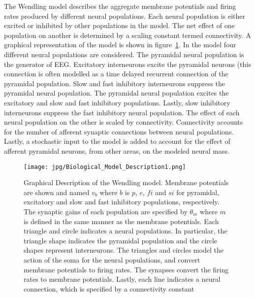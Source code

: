 The Wendling model describes the aggregate membrane potentials and firing rates produced by different neural populations. Each neural population is either excited or inhibited by other populations in the model. The net effect of one population on another is determined by a scaling constant termed connectivity. A graphical representation of the model is shown in figure~\ref{fig: Biological}. In the model four different neural populations are considered. The pyramidal neural population is the generator of EEG. Excitatory interneurons excite the pyramidal neurons (this connection is often modelled as a time delayed recurrent connection of the pyramidal population. Slow and fast inhibitory interneurons suppress the pyramidal neural population. The pyramidal neural population excites the excitatory and slow and fast inhibitory populations. Lastly, slow inhibitory interneurons suppress the fast inhibitory neural population. The effect of each neural population on the other is scaled by connectivity. Connectivity accounts for the number of afferent synaptic connections between neural populations.  Lastly, a stochastic input to the model is added to account for the effect of afferent pyramidal neurons, from other areas, on the modeled neural mass.%
\begin{figure}  %
	\centering
		\texttt{[image: jpg/Biological\_Model\_Description1.png]}
	\caption{Graphical Description of the Wendling model. Membrane potentials are shown and named $v_{b}$ where $b$ is $p$, $e$, $fi$ and $si$ for pyramidal, excitatory and slow and fast inhibitory populations, respectively. The synaptic gains of each population are specified by $\theta_{m}$ where $m$ is defined in the same manner as the membrane potentials. Each triangle and circle indicates a neural populations. In particular, the triangle shape indicates the pyramidal population and the circle shapes represent interneurons. The triangles and circles model the action of the soma for the neural populations, and convert membrane potentials to firing rates. The synapses convert the firing rates to membrane potentials. Lastly, each line indicates a neural connection, which is specified by a connectivity constant}
	\label{fig: Biological}
\end{figure}%

